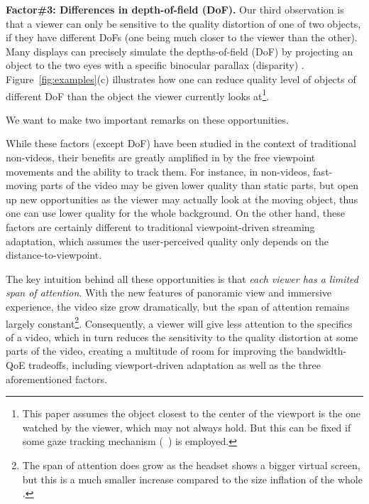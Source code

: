 \begin{packeditemize}
\item {\bf Factor\#3: Differences in depth-of-field (DoF).} 
Our third observation is that a viewer can only be sensitive to the quality distortion of one of two objects, if they have different DoFs (\eg one being much closer to the viewer than the other).
Many \vr displays can precisely simulate the depths-of-field (DoF) by projecting an object to the two eyes with a specific binocular parallax (disparity) . 
Figure~\ref{fig:examples}(c) illustrates how one can reduce quality level of objects of different DoF than the object the viewer currently looks at\footnote{This paper assumes the object closest to the center of the viewport is the one watched by the viewer, which may not always hold. But this can be fixed if some gaze tracking mechanism (\eg~\cite{??,??}) is employed.}.

\end{packeditemize}
We want to make two important remarks on these opportunities.

While these factors (except DoF) have been studied in the context of traditional non-\vr videos, their benefits are greatly amplified in \vrvideo by the free viewpoint movements and the ability to track them. 
For instance, in non-\vr videos, fast-moving parts of the video may be given lower quality than static parts, but \vrvideos open up new opportunities as the viewer may actually look at the moving object, thus one can use lower quality for the whole background. 
On the other hand, these factors are certainly different to traditional viewpoint-driven streaming adaptation, which assumes the user-perceived quality only depends on the distance-to-viewpoint. 


The key intuition behind all these opportunities is that {\em each viewer has a limited span of attention}.
With the new features of panoramic view and immersive experience, the video size grow dramatically, but the span of attention remains largely constant\footnote{The span of attention does grow as the \vr headset shows a bigger virtual screen, but this is a much smaller increase compared to the size inflation of the whole \vrvideo.}. 
Consequently, a viewer will give less attention to the specifics of a \vr video, which in turn reduces the sensitivity to the quality distortion at some parts of the video, creating a multitude of room for improving the bandwidth-QoE tradeoffs, including viewport-driven adaptation as well as the three aforementioned factors.


